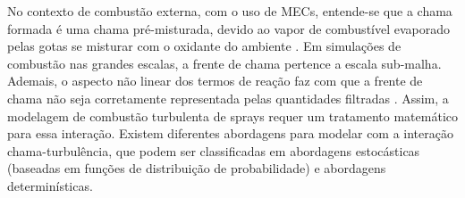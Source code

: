 

No contexto de combustão externa, com o uso de MECs, entende-se que a chama formada é uma chama pré-misturada, devido ao vapor de combustível evaporado pelas gotas se misturar com o oxidante do ambiente \cite{PoinsotVeynante2005}.
Em simulações de combustão nas grandes escalas, a frente de chama pertence a escala sub-malha.
Ademais, o aspecto não linear dos termos de reação faz com que a frente de chama não seja corretamente representada pelas quantidades filtradas \cite{SacomanoF2017PhD}.
Assim, a modelagem de combustão turbulenta de sprays requer um tratamento matemático para essa interação.
Existem diferentes abordagens para modelar com a interação chama-turbulência, que podem ser classificadas em abordagens estocásticas (baseadas em funções de distribuição de probabilidade) e abordagens determinísticas.

